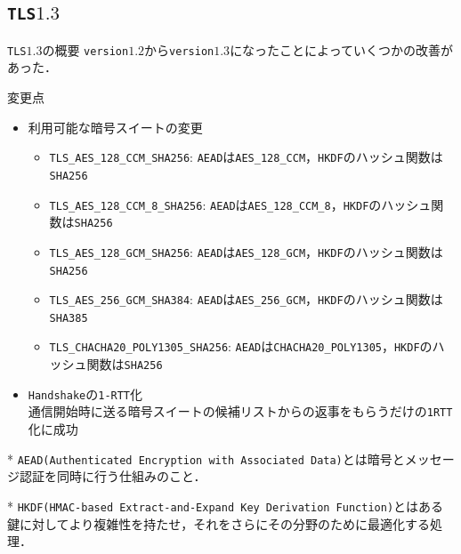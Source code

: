 \documentclass[11pt, aspectratio=169]{beamer}
\begin{document}
\subsection{\texttt{TLS}$1.3$}
\begin{frame}{\texttt{TLS}$1.3$の概要}
  \texttt{version}$1.2$から\texttt{version}$1.3$になったことによっていくつかの改善があった．
  \begin{block}{変更点}
    \begin{itemize}
      \item 利用可能な暗号スイートの変更 \\
      \begin{itemize}
        \item \texttt{TLS\_AES\_128\_CCM\_SHA256}: \texttt{AEAD}は\texttt{AES\_128\_CCM}，\texttt{HKDF}のハッシュ関数は\texttt{SHA256}
        \item \texttt{TLS\_AES\_128\_CCM\_8\_SHA256}: \texttt{AEAD}は\texttt{AES\_128\_CCM\_8}，\texttt{HKDF}のハッシュ関数は\texttt{SHA256}
        \item \texttt{TLS\_AES\_128\_GCM\_SHA256}: \texttt{AEAD}は\texttt{AES\_128\_GCM}，\texttt{HKDF}のハッシュ関数は\texttt{SHA256}
        \item \texttt{TLS\_AES\_256\_GCM\_SHA384}: \texttt{AEAD}は\texttt{AES\_256\_GCM}，\texttt{HKDF}のハッシュ関数は\texttt{SHA385}
        \item \texttt{TLS\_CHACHA20\_POLY1305\_SHA256}: \texttt{AEAD}は\texttt{CHACHA20\_POLY1305}，\texttt{HKDF}のハッシュ関数は\texttt{SHA256}
      \end{itemize}
      \item \texttt{Handshake}の\texttt{1-RTT}化 \\
        通信開始時に送る暗号スイートの候補リストからの返事をもらうだけの\texttt{1RTT}化に成功
    \end{itemize}
  \end{block}
  {
  \small
  * \texttt{AEAD(Authenticated Encryption with Associated Data)}とは暗号とメッセージ認証を同時に行う仕組みのこと．

  * \texttt{HKDF(HMAC-based Extract-and-Expand Key Derivation Function)}とはある鍵に対してより複雑性を持たせ，それをさらにその分野のために最適化する処理．
  }
\end{frame}
\end{document}
